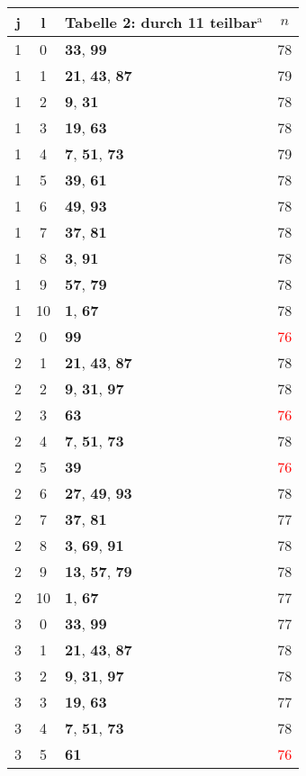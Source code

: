 \documentclass{article}
\begin{document}
\begin{minipage}[t]{0.5\textwidth}
\vspace{0pt}
\begin{tabular}{||c|c|l|c||}
	j&l&Tabelle 2: durch 11 teilbar$^{\mathrm{a}}$&$n$\\
	\hline
	1&0&\textbf{33}, \textbf{99}&78\\
	1&1&\textbf{21}, \textbf{43}, \textbf{87}&79\\
	1&2&\textbf{9}, \textbf{31}&78\\
	1&3&\textbf{19}, \textbf{63}&78\\
	1&4&\textbf{7}, \textbf{51}, \textbf{73}&79\\
	1&5&\textbf{39}, \textbf{61}&78\\
	1&6&\textbf{49}, \textbf{93}&78\\
	1&7&\textbf{37}, \textbf{81}&78\\
	1&8&\textbf{3}, \textbf{91}&78\\
	1&9&\textbf{57}, \textbf{79}&78\\
	1&10&\textbf{1}, \textbf{67}&78\\
	2&0&\textbf{99}&\textcolor{red}{76}\\
	2&1&\textbf{21}, \textbf{43}, \textbf{87}&78\\
	2&2&\textbf{9}, \textbf{31}, \textbf{97}&78\\
	2&3&\textbf{63}&\textcolor{red}{76}\\
	2&4&\textbf{7}, \textbf{51}, \textbf{73}&78\\
	2&5&\textbf{39}&\textcolor{red}{76}\\
	2&6&\textbf{27}, \textbf{49}, \textbf{93}&78\\
	2&7&\textbf{37}, \textbf{81}&77\\
	2&8&\textbf{3}, \textbf{69}, \textbf{91}&78\\
	2&9&\textbf{13}, \textbf{57}, \textbf{79}&78\\
	2&10&\textbf{1}, \textbf{67}&77\\
	3&0&\textbf{33}, \textbf{99}&77\\
	3&1&\textbf{21}, \textbf{43}, \textbf{87}&78\\
	3&2&\textbf{9}, \textbf{31}, \textbf{97}&78\\
	3&3&\textbf{19}, \textbf{63}&77\\
	3&4&\textbf{7}, \textbf{51}, \textbf{73}&78\\
	3&5&\textbf{61}&\textcolor{red}{76}\\
\end{tabular}
\end{minipage}
\end{document}
